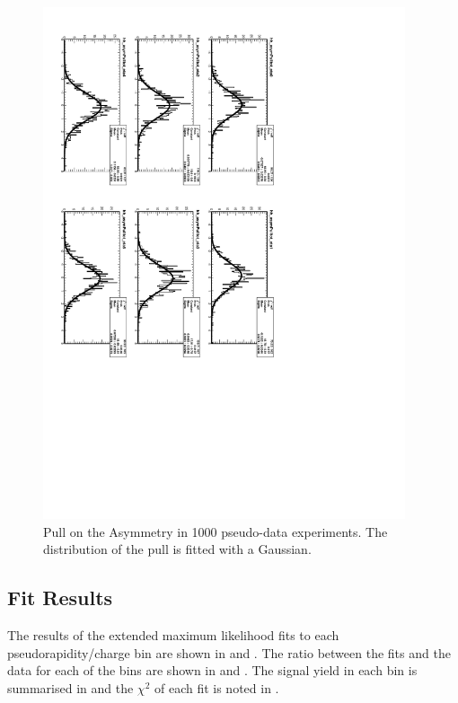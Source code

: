 \begin{figure}[htbp]
  \begin{center}
\includegraphics*[angle=90,width=0.95\textwidth]{pullasyTot.pdf}
    \caption{\label{fig:toyasym_pull}Pull on the Asymmetry in 1000 pseudo-data experiments. The distribution of the pull is fitted with a Gaussian.}
  \end{center}
\end{figure}

\subsection{Fit Results}

The results of the extended maximum likelihood fits to each pseudorapidity/charge
bin are shown in  and .
The ratio between the fits and the data for each of the 
bins are shown in  and .
The signal yield in each bin is summarised in  and the
$\chi^2$ of each fit is noted in .

